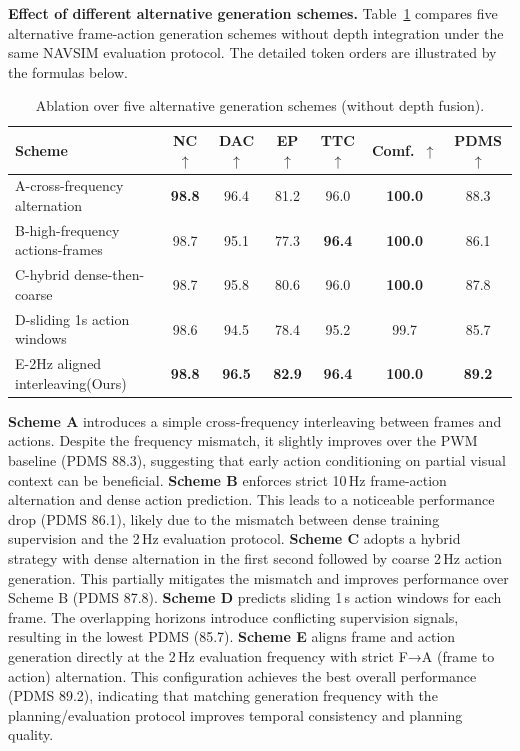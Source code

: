 \documentclass[runningheads]{llncs}
\begin{document}
\noindent\textbf{Effect of different alternative generation schemes.}
Table~\ref{tab:ablation_scheme} compares five alternative frame-action generation schemes without depth integration under the same NAVSIM evaluation protocol. The detailed token orders are illustrated by the formulas below.

\begin{table}[ht]
\centering
\caption{Ablation over five alternative generation schemes (without depth fusion).}
\label{tab:ablation_scheme}
\begin{tabular}{l|ccccc|>{\columncolor{gray!20}}c}
\toprule
Scheme
& NC $\uparrow$ 
& DAC $\uparrow$ 
& EP $\uparrow$ 
& TTC $\uparrow$ 
& Comf.\ $\uparrow$ 
& PDMS $\uparrow$ \\
\midrule
A-cross-frequency alternation & \textbf{98.8} & 96.4 & 81.2 & 96.0 & \textbf{100.0} & 88.3 \\
B-high-frequency actions-frames & 98.7 & 95.1 & 77.3 & \textbf{96.4} & \textbf{100.0} & 86.1\\
C-hybrid dense-then-coarse & 98.7 & 95.8 & 80.6 & 96.0 & \textbf{100.0} & 87.8 \\
D-sliding 1s action windows & 98.6 & 94.5 & 78.4 & 95.2 & 99.7 & 85.7 \\
E-2Hz aligned interleaving(Ours) & \textbf{98.8} & \textbf{96.5} & \textbf{82.9} & \textbf{96.4} & \textbf{100.0} & \textbf{89.2} \\
\bottomrule
\end{tabular}
\end{table}

\textbf{Scheme A} introduces a simple cross-frequency interleaving between frames and actions. Despite the frequency mismatch, it slightly improves over the PWM baseline (PDMS 88.3), suggesting that early action conditioning on partial visual context can be beneficial.
\textbf{Scheme B} enforces strict 10\,Hz frame-action alternation and dense action prediction. This leads to a noticeable performance drop (PDMS 86.1), likely due to the mismatch between dense training supervision and the 2\,Hz evaluation protocol.
\textbf{Scheme C} adopts a hybrid strategy with dense alternation in the first second followed by coarse 2\,Hz action generation. This partially mitigates the mismatch and improves performance over Scheme B (PDMS 87.8).
\textbf{Scheme D} predicts sliding 1\,s action windows for each frame. The overlapping horizons introduce conflicting supervision signals, resulting in the lowest PDMS (85.7).
\label{sec:scheme-E}
\textbf{Scheme E} aligns frame and action generation directly at the 2\,Hz evaluation frequency with strict F→A (frame to action) alternation. This configuration achieves the best overall performance (PDMS 89.2), indicating that matching generation frequency with the planning/evaluation protocol improves temporal consistency and planning quality.
\end{document}
